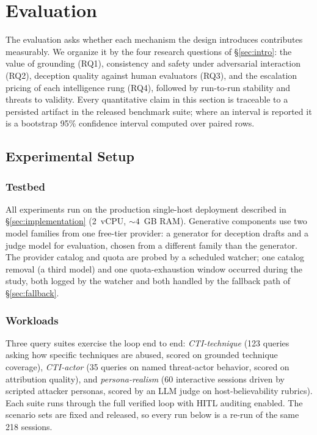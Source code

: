 \section{Evaluation}
\label{sec:evaluation}



The evaluation asks whether each mechanism the design introduces
contributes measurably. We organize it by the four research questions of
\S\ref{sec:intro}: the value of grounding (RQ1), consistency and safety
under adversarial interaction (RQ2), deception quality against human
evaluators (RQ3), and the escalation pricing of each intelligence rung
(RQ4), followed by run-to-run stability and threats to
validity. Every quantitative claim in this section is traceable to a
persisted artifact in the released benchmark suite; where an interval is
reported it is a bootstrap 95\% confidence interval computed over paired
rows.

\subsection{Experimental Setup}
\label{sec:setup}

\subsubsection{Testbed}
All experiments run on the production single-host deployment described in
\S\ref{sec:implementation} (2~vCPU, ${\sim}4$~GB RAM). Generative
components use two model families from one free-tier provider: a generator
for deception drafts and a judge model for evaluation, chosen from a
different family than the generator. The provider catalog and quota are
probed by a scheduled watcher; one catalog removal (a third model) and one
quota-exhaustion window occurred during the study, both logged by the
watcher and both handled by the fallback path of \S\ref{sec:fallback}.

\subsubsection{Workloads}
Three query suites exercise the loop end to end:
\emph{CTI-technique} (123 queries asking how specific \attck techniques
are abused, scored on grounded technique coverage),
\emph{CTI-actor} (35 queries on named threat-actor behavior, scored on
attribution quality), and \emph{persona-realism} (60 interactive sessions
driven by scripted attacker personas, scored by an LLM judge on
host-believability rubrics). Each suite runs through the full verified
loop with HITL auditing enabled. The scenario sets are fixed and released,
so every run below is a re-run of the same 218 sessions.

